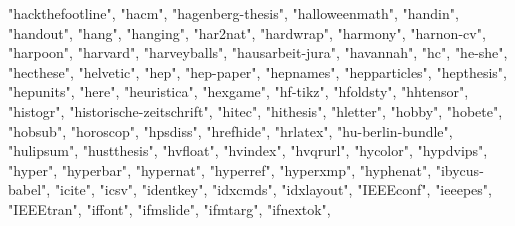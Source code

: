 \documentclass[
]{article}
\newenvironment{Shaded}{\begin{snugshade}}{\end{snugshade}}
\newcommand{\NormalTok}[1]{#1}
\newcommand{\StringTok}[1]{\textcolor[rgb]{0.31,0.60,0.02}{#1}}
\begin{document}
\begin{Shaded}
\begin{Highlighting}[]
\StringTok{"hackthefootline"}\NormalTok{, }\StringTok{"hacm"}\NormalTok{, }\StringTok{"hagenberg{-}thesis"}\NormalTok{, }\StringTok{"halloweenmath"}\NormalTok{, }
\StringTok{"handin"}\NormalTok{, }\StringTok{"handout"}\NormalTok{, }\StringTok{"hang"}\NormalTok{, }\StringTok{"hanging"}\NormalTok{, }\StringTok{"har2nat"}\NormalTok{, }\StringTok{"hardwrap"}\NormalTok{, }
\StringTok{"harmony"}\NormalTok{, }\StringTok{"harnon{-}cv"}\NormalTok{, }\StringTok{"harpoon"}\NormalTok{, }\StringTok{"harvard"}\NormalTok{, }\StringTok{"harveyballs"}\NormalTok{, }
\StringTok{"hausarbeit{-}jura"}\NormalTok{, }\StringTok{"havannah"}\NormalTok{, }\StringTok{"hc"}\NormalTok{, }\StringTok{"he{-}she"}\NormalTok{, }\StringTok{"hecthese"}\NormalTok{, }\StringTok{"helvetic"}\NormalTok{, }
\StringTok{"hep"}\NormalTok{, }\StringTok{"hep{-}paper"}\NormalTok{, }\StringTok{"hepnames"}\NormalTok{, }\StringTok{"hepparticles"}\NormalTok{, }\StringTok{"hepthesis"}\NormalTok{, }
\StringTok{"hepunits"}\NormalTok{, }\StringTok{"here"}\NormalTok{, }\StringTok{"heuristica"}\NormalTok{, }\StringTok{"hexgame"}\NormalTok{, }\StringTok{"hf{-}tikz"}\NormalTok{, }\StringTok{"hfoldsty"}\NormalTok{, }
\StringTok{"hhtensor"}\NormalTok{, }\StringTok{"histogr"}\NormalTok{, }\StringTok{"historische{-}zeitschrift"}\NormalTok{, }\StringTok{"hitec"}\NormalTok{, }\StringTok{"hithesis"}\NormalTok{, }
\StringTok{"hletter"}\NormalTok{, }\StringTok{"hobby"}\NormalTok{, }\StringTok{"hobete"}\NormalTok{, }\StringTok{"hobsub"}\NormalTok{, }\StringTok{"horoscop"}\NormalTok{, }\StringTok{"hpsdiss"}\NormalTok{, }
\StringTok{"hrefhide"}\NormalTok{, }\StringTok{"hrlatex"}\NormalTok{, }\StringTok{"hu{-}berlin{-}bundle"}\NormalTok{, }\StringTok{"hulipsum"}\NormalTok{, }\StringTok{"hustthesis"}\NormalTok{, }
\StringTok{"hvfloat"}\NormalTok{, }\StringTok{"hvindex"}\NormalTok{, }\StringTok{"hvqrurl"}\NormalTok{, }\StringTok{"hycolor"}\NormalTok{, }\StringTok{"hypdvips"}\NormalTok{, }\StringTok{"hyper"}\NormalTok{, }
\StringTok{"hyperbar"}\NormalTok{, }\StringTok{"hypernat"}\NormalTok{, }\StringTok{"hyperref"}\NormalTok{, }\StringTok{"hyperxmp"}\NormalTok{, }\StringTok{"hyphenat"}\NormalTok{, }\StringTok{"ibycus{-}babel"}\NormalTok{, }
\StringTok{"icite"}\NormalTok{, }\StringTok{"icsv"}\NormalTok{, }\StringTok{"identkey"}\NormalTok{, }\StringTok{"idxcmds"}\NormalTok{, }\StringTok{"idxlayout"}\NormalTok{, }\StringTok{"IEEEconf"}\NormalTok{, }
\StringTok{"ieeepes"}\NormalTok{, }\StringTok{"IEEEtran"}\NormalTok{, }\StringTok{"iffont"}\NormalTok{, }\StringTok{"ifmslide"}\NormalTok{, }\StringTok{"ifmtarg"}\NormalTok{, }\StringTok{"ifnextok"}\NormalTok{, }

\end{Highlighting}
\end{Shaded}
\end{document}
